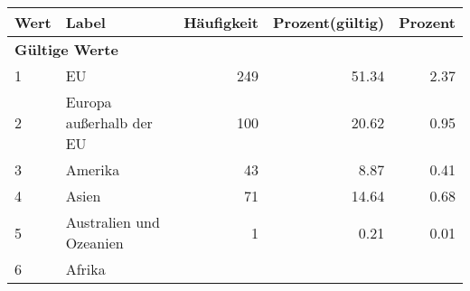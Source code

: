      \begin{longtable}{lXrrr}
     \toprule
     \textbf{Wert} & \textbf{Label} & \textbf{Häufigkeit} & \textbf{Prozent(gültig)} & \textbf{Prozent} \\
     \endhead
     \midrule
     \multicolumn{5}{l}{\textbf{Gültige Werte}}\\

     1 &
     \multicolumn{1}{X}{ EU   } &


       \num{249} &
       \num[round-mode=places,round-precision=2]{51,34} &
         \num[round-mode=places,round-precision=2]{2,37} \\

     2 &
     \multicolumn{1}{X}{ Europa außerhalb der EU   } &


       \num{100} &
       \num[round-mode=places,round-precision=2]{20,62} &
         \num[round-mode=places,round-precision=2]{0,95} \\

     3 &
     \multicolumn{1}{X}{ Amerika   } &


       \num{43} &
       \num[round-mode=places,round-precision=2]{8,87} &
         \num[round-mode=places,round-precision=2]{0,41} \\

     4 &
     \multicolumn{1}{X}{ Asien   } &


       \num{71} &
       \num[round-mode=places,round-precision=2]{14,64} &
         \num[round-mode=places,round-precision=2]{0,68} \\

     5 &
     \multicolumn{1}{X}{ Australien und Ozeanien   } &


       \num{1} &
       \num[round-mode=places,round-precision=2]{0,21} &
         \num[round-mode=places,round-precision=2]{0,01} \\

     6 &
     \multicolumn{1}{X}{ Afrika   } &



\end{longtable}
